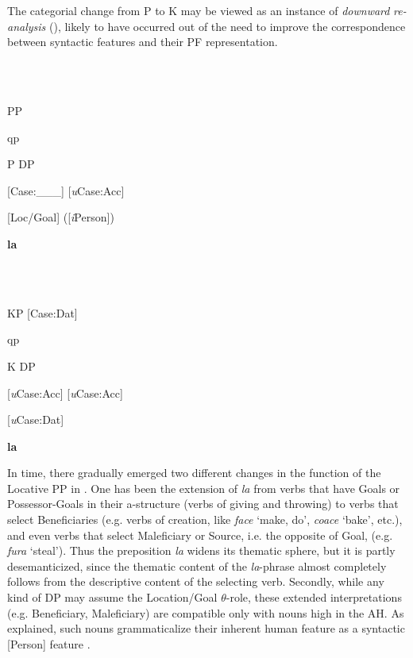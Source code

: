 \documentclass[output=paper,colorlinks,citecolor=brown]{./langscibook}
\begin{document}
The categorial change from P to K may be viewed as an instance of \textit{downward} \textit{re-analysis} (\citealt{RobertsRoussou2003}), likely to have occurred out of the need to improve the correspondence between syntactic features and their PF representation.

\ea%
    \label{ex:key:12}
    \gll\\
        \\
    \glt
    \z

                  PP        

    qp

P      DP      

    [Case:\_\_\_]    [\textit{u}Case:Acc]

    [Loc/Goal]    ([\textit{i}Person])

    \textbf{la}

\ea%
    \label{ex:key:13}
    \gll\\
        \\
    \glt
    \z

              KP [Case:Dat]

    qp

    K      DP

    [\textit{u}Case:Acc]    [\textit{u}Case:Acc]

    [\textit{u}Case:Dat]

    \textbf{la}

In time, there gradually emerged two different changes in the function of the Locative PP in . One has been the extension of \textit{la} from verbs that have Goals or Possessor-Goals in their a-structure (verbs of giving and throwing) to verbs that select Beneficiaries (e.g. verbs of creation, like \textit{face} ‘make, do’, \textit{coace} ‘bake’, etc.), and even verbs that select Maleficiary or Source, i.e. the opposite of Goal, (e.g. \textit{fura} ‘steal’). Thus the preposition \textit{la} widens its thematic sphere, but it is partly desemanticized, since the thematic content of the \textit{la}{}-phrase almost completely follows from the descriptive content of the selecting verb. Secondly, while any kind of DP may assume the Location/Goal ${\theta}${}-role, these extended interpretations (e.g. Beneficiary, Maleficiary) are compatible only with nouns high in the AH. As explained, such nouns grammaticalize their inherent human feature as a syntactic [Person] feature \citep{Richards2008}.

\ea%
    \label{ex:key:14}
    \gll\\
        \\
    \glt
    \z
\end{document}
